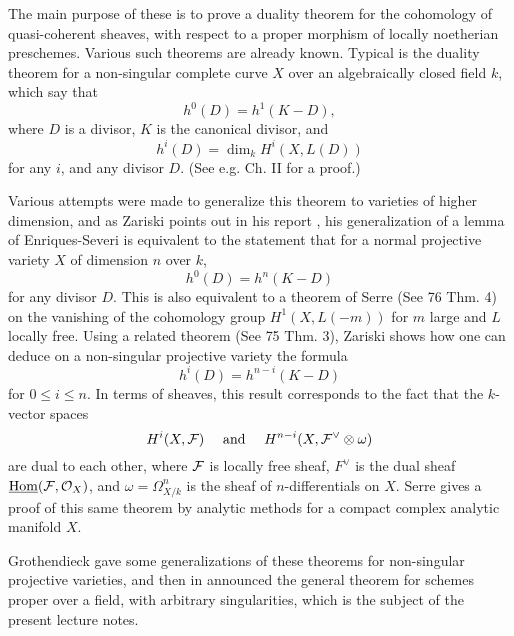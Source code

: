 The main purpose of these is to prove a duality theorem for the cohomology of quasi-coherent sheaves, with respect to a proper morphism of locally noetherian preschemes. Various such theorems are already known. Typical is the duality theorem for a non-singular complete curve $X$ over an algebraically closed field $k$, which say that
\[h^0(D)=h^1(K-D),\]
where $D$ is a divisor, $K$ is the canonical divisor, and 
\[h^{i}(D)=\dim_k H^i(X,L(D))\]
for any $i$, and any divisor $D$. (See e.g. \cite{s1959} Ch. II for a proof.) \par

Various attempts were made to generalize this theorem to varieties of higher dimension, and as Zariski points out in his report \cite{report1956}, his generalization of a lemma of Enriques-Severi \cite{z1952} is equivalent to the statement that for a normal projective variety $X$ of dimension $n$ over $k$,
\[h^0(D)=h^n(K-D)\]
for any divisor $D$. This is also equivalent to a theorem of Serre (See \cite{fac} 76 Thm. 4) on the vanishing of the cohomology group $H^1(X,L(-m))$ for $m$ large and $L$ locally free. Using a related theorem (See \cite{fac} 75 Thm. 3), Zariski shows how one can deduce on a non-singular projective variety the formula
\[h^i(D)=h^{n-i}(K-D)\]
for $0\leq i\leq n$. In terms of sheaves, this result corresponds to the fact that the $k$-vector spaces
\[H^i(X,\mathcal{F})\quad \textrm{ and } \quad H^{n-i}(X,\mathcal{F}^{\vee}\otimes \omega)\]
are dual to each other, where $\mathcal{F}$ is locally free sheaf, $F^{\vee}$ is the dual sheaf $\underline{\mathrm{Hom}}(\mathcal{F},\mathcal{O}_X)$, and $\omega=\Omega^n_{X/k}$ is the sheaf of $n$-differentials on $X$. Serre gives a proof of this same theorem by analytic methods for a compact complex analytic manifold $X$.\par

Grothendieck gave some generalizations of these theorems for non-singular projective varieties, and then in \cite{} announced the general theorem for schemes proper over a field, with arbitrary singularities, which is the subject of the present lecture notes.\par 

